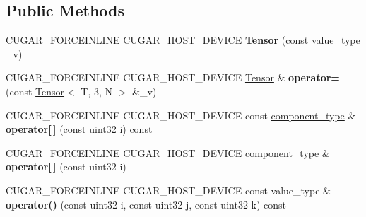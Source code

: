 \subsection*{Public Methods}
\begin{DoxyCompactItemize}
\item 
\mbox{\label{structcugar_1_1_tensor_3_01_t_00_013_00_01_n_01_4_a8785c25190a039a208a11f0c9e2208c1}} 
C\+U\+G\+A\+R\+\_\+\+F\+O\+R\+C\+E\+I\+N\+L\+I\+NE C\+U\+G\+A\+R\+\_\+\+H\+O\+S\+T\+\_\+\+D\+E\+V\+I\+CE {\bfseries Tensor} (const value\+\_\+type \+\_\+v)
\item 
\mbox{\label{structcugar_1_1_tensor_3_01_t_00_013_00_01_n_01_4_aaec1917ab155c1989619c4ce8cc12f1e}} 
C\+U\+G\+A\+R\+\_\+\+F\+O\+R\+C\+E\+I\+N\+L\+I\+NE C\+U\+G\+A\+R\+\_\+\+H\+O\+S\+T\+\_\+\+D\+E\+V\+I\+CE \hyperlink{structcugar_1_1_tensor}{Tensor} \& {\bfseries operator=} (const \hyperlink{structcugar_1_1_tensor}{Tensor}$<$ T, 3, N $>$ \&\+\_\+v)
\item 
\mbox{\label{structcugar_1_1_tensor_3_01_t_00_013_00_01_n_01_4_a0321a2707eaa97c68859fdbce92df9b7}} 
C\+U\+G\+A\+R\+\_\+\+F\+O\+R\+C\+E\+I\+N\+L\+I\+NE C\+U\+G\+A\+R\+\_\+\+H\+O\+S\+T\+\_\+\+D\+E\+V\+I\+CE const \hyperlink{structcugar_1_1_tensor_3_01_t_00_012_00_01_n_01_4}{component\+\_\+type} \& {\bfseries operator\mbox{[}$\,$\mbox{]}} (const uint32 i) const
\item 
\mbox{\label{structcugar_1_1_tensor_3_01_t_00_013_00_01_n_01_4_a3f2584178603ad4c3b228392d03d8709}} 
C\+U\+G\+A\+R\+\_\+\+F\+O\+R\+C\+E\+I\+N\+L\+I\+NE C\+U\+G\+A\+R\+\_\+\+H\+O\+S\+T\+\_\+\+D\+E\+V\+I\+CE \hyperlink{structcugar_1_1_tensor_3_01_t_00_012_00_01_n_01_4}{component\+\_\+type} \& {\bfseries operator\mbox{[}$\,$\mbox{]}} (const uint32 i)
\item 
\mbox{\label{structcugar_1_1_tensor_3_01_t_00_013_00_01_n_01_4_a797cfe57d7eff7c2f76af0963f0f822e}} 
C\+U\+G\+A\+R\+\_\+\+F\+O\+R\+C\+E\+I\+N\+L\+I\+NE C\+U\+G\+A\+R\+\_\+\+H\+O\+S\+T\+\_\+\+D\+E\+V\+I\+CE const value\+\_\+type \& {\bfseries operator()} (const uint32 i, const uint32 j, const uint32 k) const
\item 

\end{DoxyCompactItemize}
